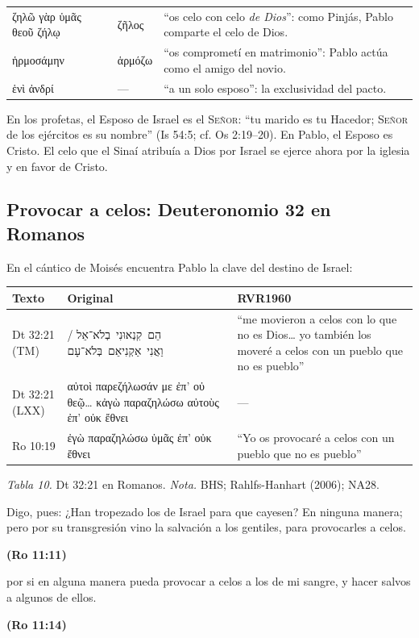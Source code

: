 \documentclass[11pt,letterpaper]{article}
\newcommand{\heb}[1]{\mbox{\foreignlanguage{hebrew}{#1}}}
\newcommand{\grc}[1]{\foreignlanguage{ancientgreek}{#1}}
\newcommand{\SENOR}{\textsc{Señor}}
\newcommand{\fuente}[1]{\par\hfill{\upshape\bfseries\small\textcolor{azul}{#1}}}
\begin{document}
\begin{filologia}[2 Co 11:2]
\begin{tabular}{@{}L{3.2cm}L{1.6cm}L{10cm}@{}}
\grc{ζηλῶ γὰρ ὑμᾶς θεοῦ ζήλῳ} & \grc{ζῆλος} & ``os celo con celo \emph{de Dios}'': como Pinjás, Pablo comparte el celo de Dios. \\[2pt]
\grc{ἡρμοσάμην} & \grc{ἁρμόζω} & ``os comprometí en matrimonio'': Pablo actúa como el amigo del novio. \\[2pt]
\grc{ἑνὶ ἀνδρί} & --- & ``a un solo esposo'': la exclusividad del pacto. \\
\end{tabular}
\end{filologia}

En los profetas, el Esposo de Israel es el \SENOR: ``tu marido es tu Hacedor; \SENOR{} de los ejércitos es su nombre'' (Is 54:5; cf. Os 2:19--20). En Pablo, el Esposo es Cristo. El celo que el Sinaí atribuía a Dios por Israel se ejerce ahora por la iglesia y en favor de Cristo.

\subsection{Provocar a celos: Deuteronomio 32 en Romanos}
En el cántico de Moisés encuentra Pablo la clave del destino de Israel:

\begin{center}\small\renewcommand{\arraystretch}{1.18}
\begin{tabular}{@{}L{2.0cm}L{6.0cm}L{5.8cm}@{}}
\toprule
\textbf{Texto} & \textbf{Original} & \textbf{RVR1960} \\ \midrule
Dt 32:21 (TM) & \heb{הֵם קִנְאוּנִי בְלֹא־אֵל} / \heb{וַאֲנִי אַקְנִיאֵם בְּלֹא־עָם} & ``me movieron a celos con lo que no es Dios\ldots{} yo también los moveré a celos con un pueblo que no es pueblo'' \\
Dt 32:21 (LXX) & \grc{αὐτοὶ παρεζήλωσάν με ἐπ’ οὐ θεῷ\ldots{} κἀγὼ παραζηλώσω αὐτοὺς ἐπ’ οὐκ ἔθνει} & --- \\
Ro 10:19 & \grc{ἐγὼ παραζηλώσω ὑμᾶς ἐπ’ οὐκ ἔθνει} & ``Yo os provocaré a celos con un pueblo que no es pueblo'' \\
\bottomrule
\end{tabular}\par
{\footnotesize\color{gris}\textit{Tabla 10.} Dt 32:21 en Romanos. \textit{Nota.} BHS; Rahlfs-Hanhart (2006); NA28.}
\end{center}

\begin{cita}Digo, pues: ¿Han tropezado los de Israel para que cayesen? En ninguna manera; pero por su transgresión vino la salvación a los gentiles, para provocarles a celos.\fuente{(Ro 11:11)}\end{cita}
\begin{cita}por si en alguna manera pueda provocar a celos a los de mi sangre, y hacer salvos a algunos de ellos.\fuente{(Ro 11:14)}\end{cita}
\end{document}
